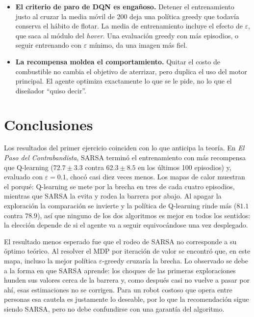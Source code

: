 \documentclass[11pt]{article}
\begin{document}
\begin{itemize}
    \item \textbf{El criterio de paro de DQN es engañoso.} Detener el
    entrenamiento justo al cruzar la media móvil de 200 deja una política greedy
    que todavía conserva el hábito de flotar. La media de entrenamiento incluye
    el efecto de $\varepsilon$, que saca al módulo del \emph{hover}. Una
    evaluación greedy con más episodios, o seguir entrenando con $\varepsilon$
    mínimo, da una imagen más fiel.

    \item \textbf{La recompensa moldea el comportamiento.} Quitar el costo de
    combustible no cambia el objetivo de aterrizar, pero duplica el uso del motor
    principal. El agente optimiza exactamente lo que se le pide, no lo que el
    diseñador ``quiso decir''.
\end{itemize}

\section{Conclusiones}

Los resultados del primer ejercicio coinciden con lo que anticipa la teoría. En
\emph{El Paso del Contrabandista}, SARSA terminó el entrenamiento con más
recompensa que Q-learning ($72.7 \pm 3.3$ contra $62.3 \pm 8.5$ en los últimos
100 episodios) y, evaluado con $\varepsilon = 0.1$, chocó casi diez veces menos.
Los mapas de calor muestran el porqué: Q-learning se mete por la brecha en tres
de cada cuatro episodios, mientras que SARSA la evita y rodea la barrera por
abajo. Al apagar la exploración la comparación se invierte y la política de
Q-learning rinde más ($81.1$ contra $78.9$), así que ninguno de los dos
algoritmos es mejor en todos los sentidos: la elección depende de si el agente
va a seguir equivocándose una vez desplegado.

El resultado menos esperado fue que el rodeo de SARSA no corresponde a su óptimo
teórico. Al resolver el MDP por iteración de valor se encontró que, en este mapa,
incluso la mejor política $\varepsilon$-greedy cruzaría la brecha. Lo observado
se debe a la forma en que SARSA aprende: los choques de las primeras
exploraciones hunden sus valores cerca de la barrera y, como después casi no
vuelve a pasar por ahí, esas estimaciones no se corrigen. Para un robot costoso
que opera entre personas esa cautela es justamente lo deseable, por lo que la
recomendación sigue siendo SARSA, pero no debe confundirse con una garantía del
algoritmo.
\end{document}
